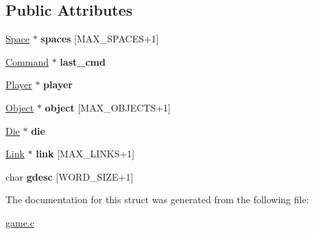 \subsection*{Public Attributes}
\begin{DoxyCompactItemize}
\item 
\mbox{\label{struct__Game_ab4180417d9148f8abb2233ca6c4ecfe5}} 
\hyperlink{struct__Space}{Space} $\ast$ {\bfseries spaces} \mbox{[}M\+A\+X\+\_\+\+S\+P\+A\+C\+ES+1\mbox{]}
\item 
\mbox{\label{struct__Game_a47afef4b632256566d81da0f50e7a380}} 
\hyperlink{command_8h_a7d2935971c252377cb0fc1c8545dc2bc}{Command} $\ast$ {\bfseries last\+\_\+cmd}
\item 
\mbox{\label{struct__Game_a31406605782d71ec00c4bf258ea76267}} 
\hyperlink{player_8h_af30e2030635a69690f85e48bc6ef202f}{Player} $\ast$ {\bfseries player}
\item 
\mbox{\label{struct__Game_acf0d86e2331b09230ba20bc31624b917}} 
\hyperlink{object_8h_a7f8bbcda919b65ce67f92fba08e0212f}{Object} $\ast$ {\bfseries object} \mbox{[}M\+A\+X\+\_\+\+O\+B\+J\+E\+C\+TS+1\mbox{]}
\item 
\mbox{\label{struct__Game_a0d6009b5dcb080489c192a9198fa7d46}} 
\hyperlink{die_8h_a892f0b0bf81d69a1f7a14ea238e36dd3}{Die} $\ast$ {\bfseries die}
\item 
\mbox{\label{struct__Game_ac0b7120da2aad265b1c9ca894ce31413}} 
\hyperlink{link_8h_ae3b299941e67be6971bfd64a25505eff}{Link} $\ast$ {\bfseries link} \mbox{[}M\+A\+X\+\_\+\+L\+I\+N\+KS+1\mbox{]}
\item 
\mbox{\label{struct__Game_a97830b210c3c69e72b90a3e2e5acc26c}} 
char {\bfseries gdesc} \mbox{[}W\+O\+R\+D\+\_\+\+S\+I\+ZE+1\mbox{]}
\end{DoxyCompactItemize}


The documentation for this struct was generated from the following file\+:\begin{DoxyCompactItemize}
\item 
\hyperlink{game_8c}{game.\+c}\end{DoxyCompactItemize}
